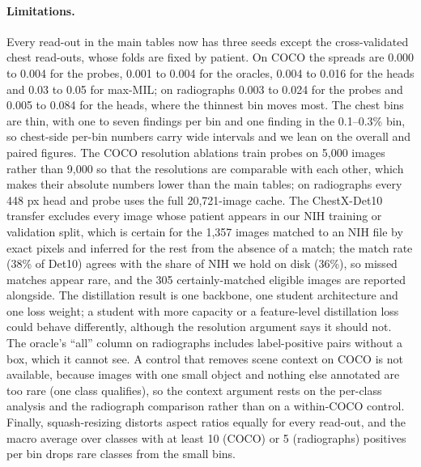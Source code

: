 \documentclass[10pt,letterpaper,twocolumn]{article}
\begin{document}
\paragraph{Limitations.}
Every read-out in the main tables now has three seeds except the cross-validated chest read-outs, whose folds are fixed by patient. On COCO the spreads are 0.000 to 0.004 for the probes, 0.001 to 0.004 for the oracles, 0.004 to 0.016 for the heads and 0.03 to 0.05 for max-MIL; on radiographs 0.003 to 0.024 for the probes and 0.005 to 0.084 for the heads, where the thinnest bin moves most. The
chest bins are thin, with one to seven findings per bin and one finding in the 0.1--0.3\% bin,
so chest-side per-bin numbers carry wide intervals and we lean on the overall and paired
figures. The COCO resolution ablations train probes on 5,000 images rather than 9,000 so that the
resolutions are comparable with each other, which makes their absolute numbers lower than the
main tables; on radiographs every 448 px head and probe uses the full 20,721-image cache. The ChestX-Det10
transfer excludes every image whose patient appears in our NIH training or validation split,
which is certain for the 1,357 images matched to an NIH file by exact pixels and inferred for
the rest from the absence of a match; the match rate (38\% of Det10) agrees with the share of
NIH we hold on disk (36\%), so missed matches appear rare, and the 305 certainly-matched
eligible images are reported alongside. The distillation result is one backbone, one student
architecture and one loss weight; a student with more capacity or a feature-level
distillation loss could behave differently, although the resolution argument says it should
not. The oracle's ``all'' column on radiographs
includes label-positive pairs without a box, which it cannot see. A control that removes
scene context on COCO is not available, because images with one small object and nothing
else annotated are too rare (one class qualifies), so the context argument rests on the
per-class analysis and the radiograph comparison rather than on a within-COCO control.
Finally, squash-resizing distorts aspect ratios equally for every read-out, and the macro
average over classes with at least 10 (COCO) or 5 (radiographs) positives per bin drops rare
classes from the small bins.
\end{document}
